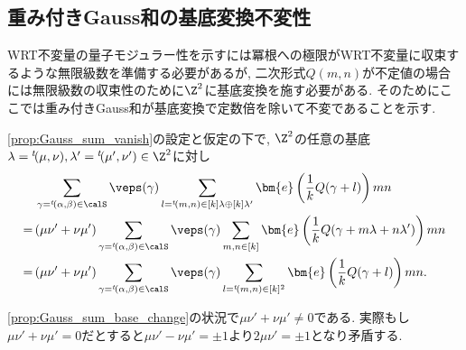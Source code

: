\documentclass[11pt,b5paper,oneside,lualatex]{ltjsarticle} %
\numberwithin{equation}{section} %
\begin{document}

\subsection{重み付きGauss和の基底変換不変性} \label{subsec:Gauss_sum_base_change}


WRT不変量の量子モジュラー性を示すには冪根への極限がWRT不変量に収束するような無限級数を準備する必要があるが, 二次形式$ Q(m, n) $が不定値の場合には無限級数の収束性のために$ \Z^2 $に基底変換を施す必要がある. 
そのためにここでは重み付きGauss和が基底変換で定数倍を除いて不変であることを示す. 

\begin{prop} \label{prop:Gauss_sum_base_change}
	\cref{prop:Gauss_sum_vanish}の設定と仮定の下で, $ \Z^2 $の任意の基底$ \lambda = {}^t\!(\mu, \nu), \lambda' = {}^t\!(\mu', \nu') \in \Z^2 $に対し
	\begin{align}
		&\sum_{\gamma = {}^t\!(\alpha, \beta) \in \calS} 
		\veps(\gamma)
		\sum_{l = {}^t\!(m, n) \in [k] \lambda \oplus [k] \lambda'}
		\bm{e}\left( \frac{1}{k} Q(\gamma + l) \right) mn
		\\			
		= \,
		&(\mu \nu' + \nu \mu')
		\sum_{\gamma = {}^t\!(\alpha, \beta) \in \calS} 
		\veps(\gamma)
		\sum_{m, n \in [k]}
		\bm{e}\left( \frac{1}{k} Q(\gamma + m \lambda + n \lambda') \right) mn
		\\			
		= \,
		&(\mu \nu' + \nu \mu')
		\sum_{\gamma = {}^t\!(\alpha, \beta) \in \calS} 
		\veps(\gamma)
		\sum_{l = {}^t\!(m, n) \in [k]^2}
		\bm{e}\left( \frac{1}{k} Q(\gamma + l) \right) mn.
	\end{align}
\end{prop}

\begin{rem}
	\cref{prop:Gauss_sum_base_change}の状況で$ \mu \nu' + \nu \mu' \neq 0 $である. 
	実際もし$ \mu \nu' + \nu \mu' = 0 $だとすると$ \mu \nu' - \nu \mu' = \pm 1 $より$ 2\mu \nu' = \pm 1 $となり矛盾する. 
\end{rem}
\end{document}
